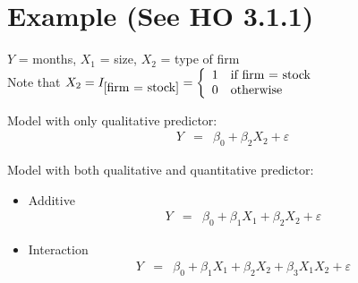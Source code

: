 \documentclass[12pt]{../notes}
\begin{document}
\section{Example (See HO 3.1.1)}
$Y$ = months, $X_1$ = size, $X_2$ = type of firm\\

Note that $X_2=I_{\mbox{[firm = stock]}} = \left\{ \begin{array}{l l}
             1 & \mbox{if firm = stock}\\
             0 & \mbox{otherwise}
            \end{array} \right.$\\

\vspace{2em}

Model with only qualitative predictor:
\begin{eqnarray}
      Y & = & \beta_0 + \beta_2 X_2 + \varepsilon \nonumber
\end{eqnarray}

Model with both qualitative and quantitative predictor:
\begin{itemize}
  \item Additive
  \begin{eqnarray}
 Y & = & \beta_0 + \beta_1 X_1 + \beta_2 X_2 + \varepsilon \nonumber
\end{eqnarray}
  \item Interaction
  \begin{eqnarray}
 Y & = & \beta_0 + \beta_1 X_1 + \beta_2 X_2 + \beta_3 X_1 X_2 + \varepsilon \nonumber
\end{eqnarray}
\end{itemize}
\end{document}
